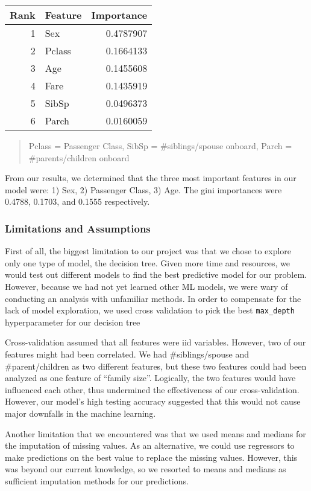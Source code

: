 \documentclass[]{article}
\begin{document}
\begin{longtable}[]{@{}rlr@{}}
\toprule
Rank & Feature & Importance\tabularnewline
\midrule
\endhead
1 & Sex & 0.4787907\tabularnewline
2 & Pclass & 0.1664133\tabularnewline
3 & Age & 0.1455608\tabularnewline
4 & Fare & 0.1435919\tabularnewline
5 & SibSp & 0.0496373\tabularnewline
6 & Parch & 0.0160059\tabularnewline
\bottomrule
\end{longtable}

\begin{quote}
Pclass = Passenger Class, SibSp = \#siblings/spouse onboard, Parch =
\#parents/children onboard
\end{quote}

From our results, we determined that the three most important features
in our model were: 1) Sex, 2) Passenger Class, 3) Age. The gini
importances were 0.4788, 0.1703, and 0.1555 respectively.

\subsubsection{Limitations and
Assumptions}\label{limitations-and-assumptions}

First of all, the biggest limitation to our project was that we chose to
explore only one type of model, the decision tree. Given more time and
resources, we would test out different models to find the best
predictive model for our problem. However, because we had not yet
learned other ML models, we were wary of conducting an analysis with
unfamiliar methods. In order to compensate for the lack of model
exploration, we used cross validation to pick the best
\texttt{max\_depth} hyperparameter for our decision tree

Cross-validation assumed that all features were iid variables. However,
two of our features might had been correlated. We had \#siblings/spouse
and \#parent/children as two different features, but these two features
could had been analyzed as one feature of ``family size''. Logically,
the two features would have influenced each other, thus undermined the
effectiveness of our cross-validation. However, our model's high testing
accuracy suggested that this would not cause major downfalls in the
machine learning.

Another limitation that we encountered was that we used means and
medians for the imputation of missing values. As an alternative, we
could use regressors to make predictions on the best value to replace
the missing values. However, this was beyond our current knowledge, so
we resorted to means and medians as sufficient imputation methods for
our predictions.
\end{document}
